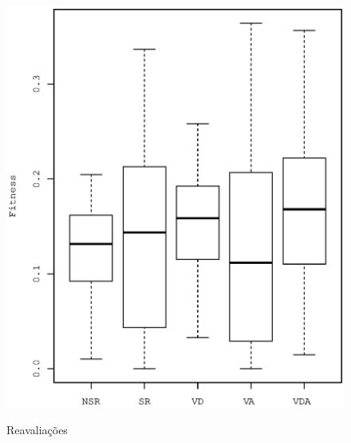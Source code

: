\begin{figure}[h]
\begin{minipage}{.4\textwidth}
        \includegraphics[width=\textwidth]{figures/reeval-sr}
        \label{fig:reeval-sr}
    \end{minipage}

    \caption{Reavaliações}
\end{figure}


